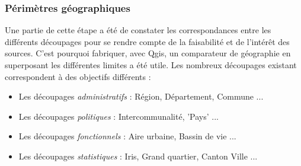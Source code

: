 \documentclass{bredele}
\begin{document}
\subsubsection{Périmètres géographiques}
Une partie de cette étape a été de constater les correspondances entre les différents découpages pour se rendre compte de la faisabilité et de l'intérêt des sources. C'est pourquoi fabriquer, avec Qgis, un comparateur de géographie en superposant les différentes limites a été utile. Les nombreux découpages existant correspondent à des objectifs différents : \\
\begin{itemize}
	\item Les découpages \textit{administratifs} : Région, Département, Commune ...
	\item Les découpages \textit{politiques} : Intercommunalité, 'Pays' ...
	\item Les découpages \textit{fonctionnels} : Aire urbaine, Bassin de vie ...
	\item Les découpages \textit{statistiques} : Iris, Grand quartier, Canton Ville ...
\end{itemize}
\end{document}

